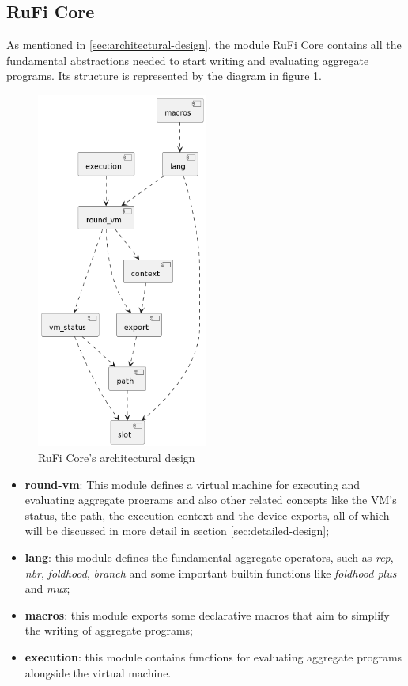 \subsection{RuFi Core}
\label{subsec:rufi-core}
As mentioned in \ref{sec:architectural-design}, the module RuFi Core contains all the fundamental abstractions needed to start writing and evaluating aggregate programs.
Its structure is represented by the diagram in figure \ref{fig:rufi-core-architecture}.

\begin{figure}[ht!]
    \centering
    \includegraphics[width=0.5\textwidth]{figures/diagrams/img/rufi-core-architecture.png}
    \caption{RuFi Core's architectural design}
    \label{fig:rufi-core-architecture}
\end{figure}

\begin{itemize}
    \item \textbf{round-vm}: This module defines a virtual machine for executing and evaluating aggregate programs and also other related concepts like the VM's status,
          the path, the execution context and the device exports, all of which will be discussed in more detail in section \ref{sec:detailed-design};
    \item \textbf{lang}: this module defines the fundamental aggregate operators, such as \textit{rep}, \textit{nbr}, \textit{foldhood}, \textit{branch} and some important builtin functions like \textit{foldhood plus} and \textit{mux};
    \item \textbf{macros}: this module exports some declarative macros that aim to simplify the writing of aggregate programs;\
    \item \textbf{execution}: this module contains functions for evaluating aggregate programs alongside the virtual machine.
\end{itemize}

